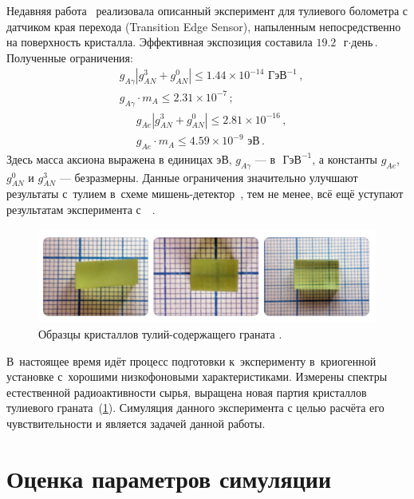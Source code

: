 \documentclass[a4paper,article,14pt]{extarticle}
\begin{document}
Недавняя работа~\cite{newlimits_tm} реализовала описанный эксперимент для тулиевого болометра с датчиком края перехода (Transition Edge Sensor), напыленным непосредственно на поверхность кристалла.
Эффективная экспозиция составила $19.2$~$\text{г} \cdot \text{день}$. Полученные ограничения:
\begin{align}
     & g_{A\gamma} \left| g_{AN}^3 + g_{AN}^0 \right| \leqslant
    1.44 \times 10^{-14} \text{\ ГэВ}^{-1}\, ,                  \\
     & g_{A\gamma } \cdot m_A \leqslant
    2.31 \times 10^{-7}\, ;\nonumber
\end{align}
\begin{align}
     & g_{Ae} \left| g_{AN}^3 + g_{AN}^0 \right| \leqslant
    2.81 \times 10^{-16}\, ,                               \\
     & g_{Ae} \cdot {m_A} \leqslant
    4.59 \times 10^{-9} \text{\ эВ}\, .\nonumber
\end{align}
Здесь масса аксиона выражена в единицах эВ, $g_{A\gamma }$ --- в $\text{ ГэВ}^{-1}$, а константы $g_{Ae }$, $g_{AN}^0$ и  $g_{AN}^3$ --- безразмерны.
Данные ограничения значительно улучшают результаты с~тулием в~схеме мишень-детектор~\cite{Derbin2009}, тем не менее, всё ещё уступают результатам эксперимента с~{\Kr}~\cite{Derbin_2017_Kr}.
\begin{figure}[t]
    \centering
    \includegraphics[width=.9\textwidth]{images/Crystals.png}
    \caption{Образцы кристаллов тулий-содержащего граната {\TmAlO}.}\label{fig:crystals}
\end{figure}

В~настоящее время идёт процесс подготовки к~эксперименту в~криогенной установке с~хорошими низкофоновыми характеристиками.
Измерены спектры естественной радиоактивности сырья, выращена новая партия кристаллов тулиевого граната~(\ref{fig:crystals}).
Симуляция данного эксперимента с целью расчёта его чувствительности и является задачей данной работы.


\pagebreak
\section{Оценка параметров симуляции}
\end{document}
